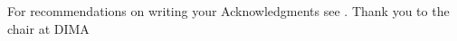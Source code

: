 For recommendations on writing your Acknowledgments see \cite{wallwork_306}.
Thank you to the chair at \ac*{DIMA}